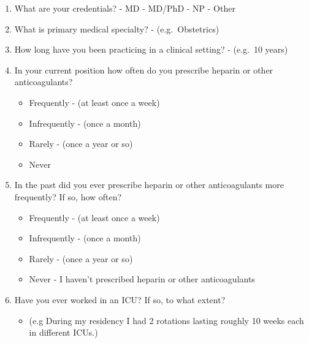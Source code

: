 \documentclass[12pt,a4paper,]{report}
\providecommand{\tightlist}{%
  \setlength{\itemsep}{0pt}\setlength{\parskip}{0pt}}
\begin{document}
\begin{enumerate}
\def\labelenumi{\arabic{enumi}.}
\tightlist
\item
  What are your credentials? - MD - MD/PhD - NP - Other\\
\item
  What is primary medical specialty? - (e.g.~Obstetrics)\\
\item
  How long have you been practicing in a clinical setting? - (e.g.~10
  years)\\
\item
  In your current position how often do you prescribe heparin or other
  anticoagulants?

  \begin{itemize}
  \tightlist
  \item
    Frequently - (at least once a week)
  \item
    Infrequently - (once a month)
  \item
    Rarely - (once a year or so)
  \item
    Never
  \end{itemize}
\item
  In the past did you ever prescribe heparin or other anticoagulants
  more frequently? If so, how often?

  \begin{itemize}
  \tightlist
  \item
    Frequently - (at least once a week)\\
  \item
    Infrequently - (once a month)
  \item
    Rarely - (once a year or so)
  \item
    Never - I haven't prescribed heparin or other anticoagulants
  \end{itemize}
\item
  Have you ever worked in an ICU? If so, to what extent?

  \begin{itemize}
  \tightlist
  \item
    (e.g During my residency I had 2 rotations lasting roughly 10 weeks
    each in different ICUs.)
  \end{itemize}
\end{enumerate}
\end{document}

